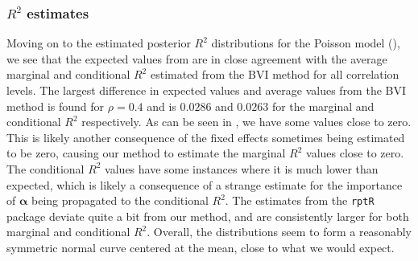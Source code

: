 \subsubsection{$R^2$ estimates}
Moving on to the estimated posterior $R^2$ distributions for the Poisson model (), we see that the expected values from  are in close agreement with the average marginal and conditional $R^2$ estimated from the BVI method for all correlation levels. The largest difference in expected values and average values from the BVI method is found for $\rho=0.4$ and is $0.0286$ and $0.0263$ for the marginal and conditional $R^2$ respectively. As can be seen in , we have some values close to zero. This is likely another consequence of the fixed effects sometimes being estimated to be zero, causing our method to estimate the marginal $R^2$ values close to zero. The conditional $R^2$ values have some instances where it is much lower than expected, which is likely a consequence of a strange estimate for the importance of $\boldsymbol{\alpha}$ being propagated to the conditional $R^2$. The estimates from the \texttt{rptR} package deviate quite a bit from our method, and are consistently larger for both marginal and conditional $R^2$. Overall, the distributions seem to form a reasonably symmetric normal curve centered at the mean, close to what we would expect.
